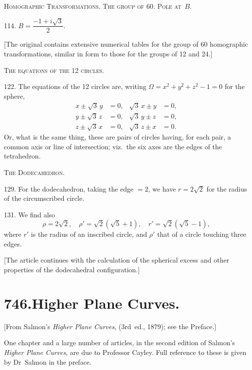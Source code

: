 \documentclass[11pt,a4paper]{book}
\begin{document}
\medskip

\noindent\textsc{Homographic Transformations. The group of 60. Pole at~$B$.}

114. $B = \dfrac{-1+i\sqrt{3}}{2}$.

[The original contains extensive numerical tables for the group of 60 homographic transformations, similar in form to those for the groups of 12 and 24.]

\medskip

\noindent\textsc{The equations of the 12 circles.}

122. The equations of the 12 circles are, writing $\Omega = x^2 + y^2 + z^2 - 1 = 0$ for the sphere,
\begin{align*}
x \pm \sqrt{3}\,y &= 0, & \sqrt{3}\,x \pm y &= 0, \\
y \pm \sqrt{3}\,z &= 0, & \sqrt{3}\,y \pm z &= 0, \\
z \pm \sqrt{3}\,x &= 0, & \sqrt{3}\,z \pm x &= 0.
\end{align*}
Or, what is the same thing, these are pairs of circles having, for each pair, a common axis or line of intersection; viz.~the six axes are the edges of the tetrahedron.

\medskip

\noindent\textsc{The Dodecahedron.}

129. For the dodecahedron, taking the edge $= 2$, we have $r = 2\sqrt{2}$ for the radius of the circumscribed circle.

131. We find also
\[
\rho = 2\sqrt{2},\quad \rho' = \sqrt{2}(\sqrt{5}+1),\quad r' = \sqrt{2}(\sqrt{5}-1),
\]
where $r'$ is the radius of an inscribed circle, and $\rho'$ that of a circle touching three edges.

[The article continues with the calculation of the spherical excess and other properties of the dodecahedral configuration.]


\newpage
\section*{\textbf{746.}\quad Higher Plane Curves.}

[From Salmon's \textit{Higher Plane Curves}, (3rd~ed., 1879); see the Preface.]

\medskip

One chapter and a large number of articles, in the second edition of Salmon's \textit{Higher Plane Curves}, are due to Professor Cayley. Full reference to these is given by Dr~Salmon in the preface.
\end{document}
